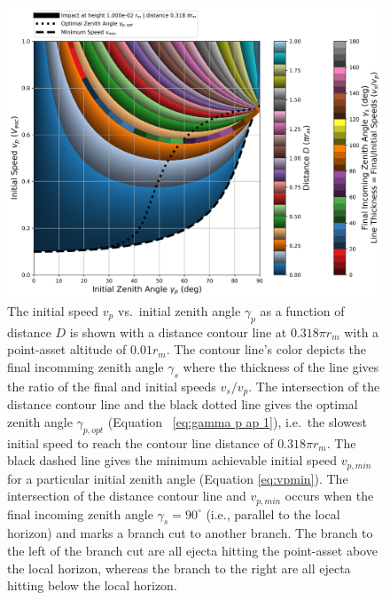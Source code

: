\documentclass{article}
\begin{document}
\begin{figure}[!htb]
	\centering
	\includegraphics[width=1.0\linewidth]{dist_speed_zenith_plot_012_1.000e-02_1.000.png}
	\caption{The initial speed $v_p$ vs.\ initial zenith angle $\gamma_p$ as a function of distance $D$ is shown with a distance contour line at $0.318\pi r_m$ with a point-asset altitude of $0.01 r_m$. The contour line's color depicts the final incomming zenith angle $\gamma_s$ where the thickness of the line gives the ratio of the final and initial speeds $v_s/v_p$. The intersection of the distance contour line and the black dotted line gives the optimal zenith angle $\gamma_{p,opt}$ (Equation~
		\eqref{eq:gamma p ap 1}), i.e.\ the slowest initial speed to reach the contour line distance of $0.318\pi r_m$. The black dashed line gives the minimum achievable initial speed $v_{p,min}$ for a particular initial zenith angle (Equation \eqref{eq:vpmin}). The intersection of the distance contour line and $v_{p,min}$ occurs when the final incoming zenith angle $\gamma_s = 90^\circ$ (i.e., parallel to the local horizon) and marks a branch cut to another branch. The branch to the left of the branch cut are all ejecta hitting the point-asset above the local horizon, whereas the branch to the right are all ejecta hitting below the local horizon.}\label{fig:dist_speed_zenith_plot_012_1.000e-02_1.000}
\end{figure}
\end{document}
